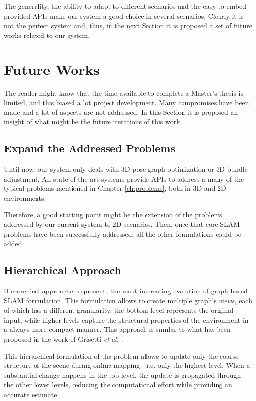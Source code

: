 \noindent The generality, the ability to adapt to different scenarios and the easy-to-embed provided APIs make our system a good choice in several scenarios. Clearly it is not the perfect system and, thus, in the next Section it is proposed a set of future works related to our system.

\section{Future Works}\label{sec:future_works}
The reader might know that the time available to complete a Master's thesis is limited, and this biased a lot project development. Many compromises have been made and a lot of aspects are not addressed. In this Section it is proposed an insight of what might be the future iterations of this work.

\subsection{Expand the Addressed Problems}
Until now, our system only deals with 3D pose-graph optimization or 3D bundle-adjustment. All state-of-the-art systems provide APIs to address a many of the typical problems mentioned in Chapter \ref{ch:problems}, both in 3D and 2D environments.

Therefore, a good starting point might be the extension of the problems addressed by our current system to 2D scenarios. Then, once that core SLAM problems have been successfully addressed, all the other formulations could be added.

\subsection{Hierarchical Approach}
Hierarchical approaches represents the most interesting evolution of graph-based SLAM formulation. This formulation allows to create multiple graph's \textit{views}, each of which has a different granularity: the bottom level represents the original input, while higher levels capture the structural properties of the environment in a always more compact manner. This approach is similar to what has been proposed in the work of Grisetti \textit{et al.} \cite{grisetti2010hogman}.

This hierarchical formulation of the problem allows to update only the coarse structure of the scene during online mapping - i.e. only the highest level. When a substantial change happens in the top level, the update is propagated through the other lower levels, reducing the computational effort while providing an accurate estimate.